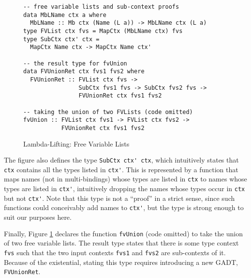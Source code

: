 \documentclass[natbib]{sigplanconf}
\begin{document}



\begin{figure}[t]
\begin{lstlisting}[basicstyle=\ttfamily\scriptsize]
-- free variable lists and sub-context proofs
data MbLName ctx a where
  MbLName :: Mb ctx (Name (L a)) -> MbLName ctx (L a)
type FVList ctx fvs = MapCtx (MbLName ctx) fvs
type SubCtx ctx' ctx =
  MapCtx Name ctx -> MapCtx Name ctx'

-- the result type for fvUnion
data FVUnionRet ctx fvs1 fvs2 where
  FVUnionRet :: FVList ctx fvs ->
                SubCtx fvs1 fvs -> SubCtx fvs2 fvs ->
                FVUnionRet ctx fvs1 fvs2

-- taking the union of two FVLists (code omitted)
fvUnion :: FVList ctx fvs1 -> FVList ctx fvs2 ->
           FVUnionRet ctx fvs1 fvs2
\end{lstlisting}
\caption{Lambda-Lifting: Free Variable Lists}
\label{fig:free-vars}
\end{figure}


The figure also defines the type \lstinline{SubCtx ctx' ctx}, which
intuitively states that \lstinline{ctx} contains all the types listed
in \lstinline{ctx'}. This is represented by a function that maps names
(not in multi-bindings) whose types are listed in \lstinline{ctx} to
names whose types are listed in \lstinline{ctx'}, intuitively dropping
the names whose types occur in \lstinline{ctx} but not
\lstinline{ctx'}. Note that this type is not a ``proof'' in a strict
sense, since such functions could conceivably add names to
\lstinline{ctx'}, but the type is strong enough to suit our purposes
here.


Finally, Figure \ref{fig:free-vars} declares the function
\lstinline{fvUnion} (code omitted) to take the union of two free
variable lists.  The result type states that there is some type
context \lstinline{fvs} such that the two input contexts
\lstinline{fvs1} and \lstinline{fvs2} are sub-contexts of it. Because
of the existential, stating this type requires introducing a new
GADT, \lstinline{FVUnionRet}.
\end{document}
